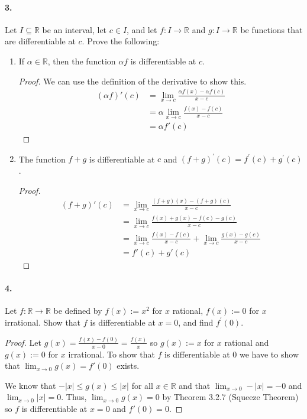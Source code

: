 \documentclass[12pt]{article}
\theoremstyle{remark}
\begin{document}
\paragraph{3.} Let $I \subseteq \mathbb{R}$ be an interval, let $c \in I$, and let $f: I \rightarrow \mathbb{R}$ and $g: I \rightarrow \mathbb{R}$ be functions that are differentiable at $c$. Prove the following:
\begin{enumerate}[label=(\alph*)]
    \item If $\alpha \in \mathbb{R}$, then the function $\alpha f$ is differentiable at $c$.
    \begin{proof}
        We can use the definition of the derivative to show this.
        \begin{align*}
            (\alpha f)'(c) &= \lim_{x \to c} \frac{\alpha f(x) - \alpha f(c)}{x - c} \\
            &= \alpha \lim_{x \to c} \frac{f(x) - f(c)}{x - c} \\
            &= \alpha f'(c)
        \end{align*}
    \end{proof}

    \item The function $f + g$ is differentiable at $c$ and $(f + g)^{\prime}(c) = f^{\prime}(c) + g^{\prime}(c)$.
    \begin{proof}
        \begin{align*}
            (f + g)'(c) &= \lim_{x \to c} \frac{(f + g)(x) - (f + g)(c)}{x - c} \\
            &= \lim_{x \to c} \frac{f(x) + g(x) - f(c) - g(c)}{x - c} \\
            &= \lim_{x \to c} \frac{f(x) - f(c)}{x - c} + \lim_{x \to c} \frac{g(x) - g(c)}{x - c} \\
            &= f'(c) + g'(c)
        \end{align*}
    \end{proof}
\end{enumerate}

\paragraph{4.} Let $f: \mathbb{R} \rightarrow \mathbb{R}$ be defined by $f(x):=x^2$ for $x$ rational, $f(x):=0$ for $x$ irrational. Show that $f$ is differentiable at $x=0$, and find $f^{\prime}(0)$.
\begin{proof}
    Let $g(x) = \frac{f(x) - f(0)}{x - 0} = \frac{f(x)}{x}$ so $g(x) := x$ for $x$ rational and $g(x) := 0$ for $x$ irrational. To show that $f$ is differentiable at 0 we have to show that $\lim_{x \to 0} g(x) = f'(0)$ exists. 
    
    We know that $-|x| \leq g(x) \leq |x|$ for all $x \in \mathbb{R}$ and that $\lim_{x \to 0} -|x| = -0$ and $\lim_{x \to 0} |x| = 0$. Thus, $\lim_{x \to 0} g(x) = 0$ by Theorem 3.2.7 (Squeeze Theorem) so $f$ is differentiable at $x = 0$ and $f'(0) = 0$.
\end{proof}
\pagebreak
\end{document}
